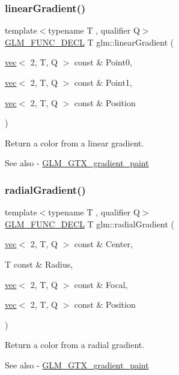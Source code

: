 \subsubsection{\texorpdfstring{linear\+Gradient()}{linearGradient()}}
{\footnotesize\ttfamily template$<$typename T , qualifier Q$>$ \\
\mbox{\hyperlink{setup_8hpp_ab2d052de21a70539923e9bcbf6e83a51}{G\+L\+M\+\_\+\+F\+U\+N\+C\+\_\+\+D\+E\+CL}} T glm\+::linear\+Gradient (\begin{DoxyParamCaption}\item[{\mbox{\hyperlink{structglm_1_1vec}{vec}}$<$ 2, T, Q $>$ const \&}]{Point0,  }\item[{\mbox{\hyperlink{structglm_1_1vec}{vec}}$<$ 2, T, Q $>$ const \&}]{Point1,  }\item[{\mbox{\hyperlink{structglm_1_1vec}{vec}}$<$ 2, T, Q $>$ const \&}]{Position }\end{DoxyParamCaption})}

Return a color from a linear gradient. \begin{DoxySeeAlso}{See also}
-\/ \mbox{\hyperlink{group__gtx__gradient__paint}{G\+L\+M\+\_\+\+G\+T\+X\+\_\+gradient\+\_\+paint}} 
\end{DoxySeeAlso}
\mbox{\label{group__gtx__gradient__paint_gaaecb1e93de4cbe0758b882812d4da294}} 
\subsubsection{\texorpdfstring{radial\+Gradient()}{radialGradient()}}
{\footnotesize\ttfamily template$<$typename T , qualifier Q$>$ \\
\mbox{\hyperlink{setup_8hpp_ab2d052de21a70539923e9bcbf6e83a51}{G\+L\+M\+\_\+\+F\+U\+N\+C\+\_\+\+D\+E\+CL}} T glm\+::radial\+Gradient (\begin{DoxyParamCaption}\item[{\mbox{\hyperlink{structglm_1_1vec}{vec}}$<$ 2, T, Q $>$ const \&}]{Center,  }\item[{T const \&}]{Radius,  }\item[{\mbox{\hyperlink{structglm_1_1vec}{vec}}$<$ 2, T, Q $>$ const \&}]{Focal,  }\item[{\mbox{\hyperlink{structglm_1_1vec}{vec}}$<$ 2, T, Q $>$ const \&}]{Position }\end{DoxyParamCaption})}

Return a color from a radial gradient. \begin{DoxySeeAlso}{See also}
-\/ \mbox{\hyperlink{group__gtx__gradient__paint}{G\+L\+M\+\_\+\+G\+T\+X\+\_\+gradient\+\_\+paint}} 
\end{DoxySeeAlso}
